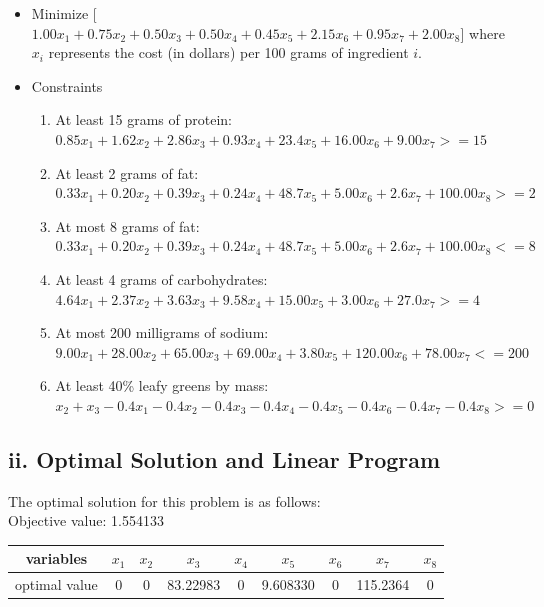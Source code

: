 \documentclass[11pt]{scrreprt}
\begin{document}
\begin{itemize}
	\item Minimize
[$1.00x_{1}+0.75x_{2}+0.50x_{3}+0.50x_{4}+0.45x_{5}+2.15x_{6}+0.95x_{7}+2.00x_{8}$] where $x_{i}$ represents the cost (in dollars) per 100 grams of ingredient $i$.
	\item Constraints
	\begin{enumerate}
		\item At least 15 grams of protein:\\
		$0.85x_{1}+1.62x_{2}+2.86x_{3}+0.93x_{4}+23.4x_{5}+16.00x_{6}+9.00x_{7} >= 15$
		\item At least 2 grams of fat:\\
		$0.33x_{1}+0.20x_{2}+0.39x_{3}+0.24x_{4}+48.7x_{5}+5.00x_{6}+2.6x_{7}+100.00x_{8} >= 2$
		\item At most 8 grams of fat:\\
		$0.33x_{1}+0.20x_{2}+0.39x_{3}+0.24x_{4}+48.7x_{5}+5.00x_{6}+2.6x_{7}+100.00x_{8} <= 8$
		\item At least 4 grams of carbohydrates:\\
		$4.64x_{1}+2.37x_{2}+3.63x_{3}+9.58x_{4}+15.00x_{5}+3.00x_{6}+27.0x_{7} >= 4$
		\item At most 200 milligrams of sodium:\\
		$9.00x_{1}+28.00x_{2}+65.00x_{3}+69.00x_{4}+3.80x_{5}+120.00x_{6}+78.00x_{7} <= 200$
		\item At least 40\% leafy greens by mass:\\
		$x_{2}+x_{3}-0.4x_{1}-0.4x_{2}-0.4x_{3}-0.4x_{4}-0.4x_{5}-0.4x_{6}-0.4x_{7}-0.4x_{8} >= 0$
	\end{enumerate}
\end{itemize}


\subsection{ii. Optimal Solution and Linear Program}
The optimal solution for this problem is as follows:\\

Objective value: 1.554133\\

\begin{tabular}{|c|c|c|c|c|c|c|c|c|}
	\hline variables & $x_{1}$ & $x_{2}$ & $x_{3}$ & $x_{4}$ & $x_{5}$ & $x_{6}$ & $x_{7}$ & $x_{8}$ \\
	\hline optimal value & 0 & 0 & 83.22983 & 0 & 9.608330 & 0 & 115.2364 & 0 \\
	\hline
\end{tabular} \\
\end{document}
